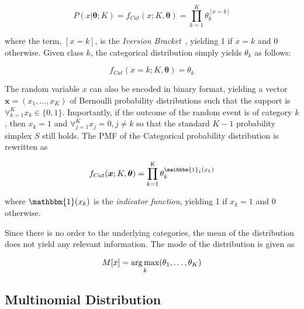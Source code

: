 \begin{equation}
      \label{eq:probability:probability_distributions:categorical:pmf}
      P(x \vert \boldsymbol{\theta}; K) = f_{Cat}(x; K, \boldsymbol{\theta}) = \prod_{k=1}^{K}\theta_{k}^{[x = k]}
\end{equation}

where the term, $[x = k]$, is the \textit{Iversion Bracket}~\cite{ref:iverson:1962}, yielding 1 if $x = k$ and 0 otherwise. Given class $k$, the categorical distribution simply yields $\theta_{k}$ as follows:

\begin{equation}
      \label{eq:probability:probability_distributions:categorical:pmf_k}
      f_{Cat}(x=k; K, \boldsymbol{\theta}) = \theta_{k}
\end{equation}

The random variable $x$ can also be encoded in binary format, yielding a vector $\boldsymbol{x} = (x_{1}, \dots, x_{K})$ of Bernoulli probability distributions such that the support is $\forall_{k=1}^{K} x_{k} \in \{0, 1\}$. Importantly, if the outcome of the random event is of category $k$, then $x_{k} = 1$ and $\forall_{j=1}^{K} x_{j} = 0, j \neq k$ so that the standard $K-1$ probability simplex $S$ still holds. The \acs{PMF} of the Categorical probability distribution is rewritten as

\begin{equation}
      \label{eq:probability:probability_distributions:categorical:pmf_alt}
      f_{Cat}(\boldsymbol{x}; K, \boldsymbol{\theta}) = \prod_{k=1}^{K}\theta_{k}^{\mathbbm{1}_{1}(x_{k})}
\end{equation}

where $\mathbbm{1}(x_{k})$ is the \textit{indicator function}, yielding 1 if $x_{k} = 1$ and 0 otherwise.

Since there is no order to the underlying categories, the mean of the distribution does not yield any relevant information. The mode of the distribution is given as

\begin{equation}
      \label{eq:probability:probability_distributions:categorical:mode}
      M[x] = \operatorname*{arg\,max}_{k}(\theta_{1}, \dots, \theta_{K})
\end{equation}


\subsection{Multinomial Distribution}
\label{sec:probability:probability_distributions:multinomial}

